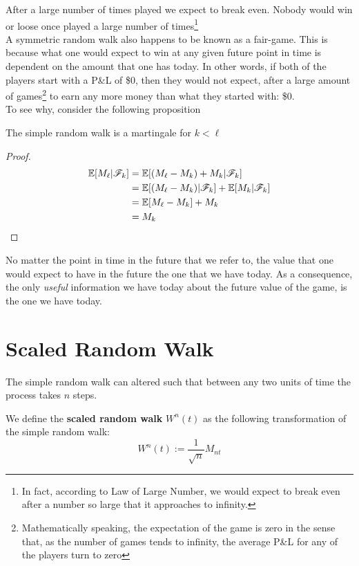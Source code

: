 \documentclass[../TGMAFFIRO]{subfiles}
\begin{document}
After a large number of times played we expect to break even. Nobody would win or loose once played a large number of times\footnote{In fact, according to Law of Large Number, we would expect to break even after a number so large that it approaches to infinity.}\\

A symmetric random walk also happens to be known as a fair-game. This is because what one would expect to win at any given future point in time is dependent on the amount that one has today. In other words, if both of the players start with a P\&L of \$0, then they would not expect, after a large amount of games\footnote{Mathematically speaking, the expectation of the game is zero in the sense that, as the number of games tends to infinity, the average P\&L for any of the players turn to zero} to earn any more money than what they started with: \$0.\\

To see why, consider the following proposition

\begin{proposition}
	The simple random walk is a martingale for $k < \ell$
\end{proposition}

\begin{proof}
	\begin{align*}
				\mathbb{E}[M_\ell|\mathscr{F}_k] &= \mathbb{E}[(M_\ell - M_k) + M_k | \mathscr{F}_k] \\
				&= \mathbb{E}[(M_\ell - M_k) | \mathscr{F}_k] + \mathbb{E}[M_k | \mathscr{F}_k] \\
				&= \mathbb{E}[M_\ell - M_k] + M_k\\
				&= M_k
	\end{align*}
\end{proof}

No matter the point in time in the future that we refer to, the value that one would expect to have in the future the one that we have today. As a consequence, the only \textit{useful} information we have today about the future value of the game, is the one we have today.

\section{Scaled Random Walk}
The simple random walk can altered such that between any two units of time the process takes $n$ steps.

\begin{definition}
	We define the \textbf{scaled random walk} $W^n(t)$ as the following transformation of the simple random walk:
	\[W^n(t) := \frac{1}{\sqrt{n}}M_{nt}\]
\end{definition}
\end{document}
